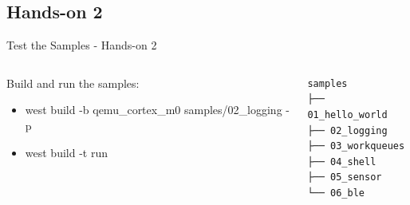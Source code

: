 \documentclass[10pt, aspectratio=169]{beamer}
\begin{document}
\subsection{Hands-on 2}
\begin{frame}[fragile]{Test the Samples - Hands-on 2}
  \begin{columns}
    \begin{column}{0.6\textwidth}
      Build and run the samples\footnotemark[1]:
      \begin{itemize}
        \item \scriptsize west build -b qemu\_cortex\_m0 samples/02\_logging -p
        \item \scriptsize west build -t run
      \end{itemize}
    \end{column}
    \begin{column}{0.4\textwidth}
        {\fontsize{7}{7}\selectfont
          \begin{verbatim}
samples
├── 01_hello_world
├── 02_logging
├── 03_workqueues
├── 04_shell
├── 05_sensor
└── 06_ble
        \end{verbatim}
      }
    \end{column}
  \end{columns}
\end{frame}
\end{document}
